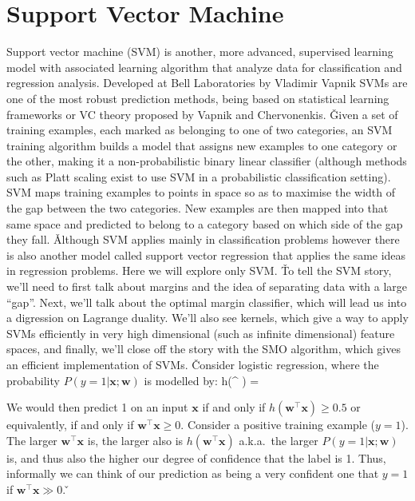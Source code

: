 \section{Support Vector Machine}

Support vector machine (SVM) is another, more advanced, supervised learning model with associated learning algorithm
that analyze data for classification and regression analysis. Developed at Bell Laboratories by Vladimir Vapnik SVMs
are one of the most robust prediction methods, being based on statistical learning frameworks or VC theory proposed
by Vapnik and Chervonenkis. \v

Given a set of training examples, each marked as belonging to one of two categories, an SVM training algorithm builds
a model that assigns new examples to one category or the other, making it a non-probabilistic binary linear
classifier (although methods such as Platt scaling exist to use SVM in a probabilistic classification setting). SVM
maps training examples to points in space so as to maximise the width of the gap between the two categories. New
examples are then mapped into that same space and predicted to belong to a category based on which side of the gap
they fall. \v

Although SVM applies mainly in classification problems however there is also another model called support vector
regression that applies the same ideas in regression problems. Here we will explore only SVM. \v

To tell the SVM story, we'll need to first talk about margins and the idea of separating data with a large ``gap''.
Next, we'll talk about the optimal margin classifier, which will lead us into a digression on Lagrange duality. We'll
also see kernels, which give a way to apply SVMs efficiently in very high dimensional (such as infinite dimensional)
feature spaces, and finally, we'll close off the story with the SMO algorithm, which gives an efficient
implementation of SVMs. \v

Consider logistic regression, where the probability $P(y = 1| \boldsymbol{x}; \boldsymbol{w})$ is modelled by:
\bse
h(^{\intercal} ) = 
\ese

We would then predict 1 on an input $\boldsymbol{x}$ if and only if $h \left(\boldsymbol{w}^{\intercal} \boldsymbol{x}\right)
\geq 0.5$ or equivalently, if and only if $\boldsymbol{w}^{\intercal} \boldsymbol{x} \geq 0$. Consider a positive
training example ($y = 1$). The larger $\boldsymbol{w}^{\intercal} \boldsymbol{x}$ is, the larger also is $h
\left(\boldsymbol{w}^{\intercal} \boldsymbol{x}\right)$ a.k.a.\ the larger $P(y = 1| \boldsymbol{x}; \boldsymbol{w})$ is, and thus
also the higher our degree of confidence that the label is 1. Thus, informally we can think of our prediction as
being a very confident one that $y = 1$ if $\boldsymbol{w}^{\intercal} \boldsymbol{x} \gg 0$. \v

